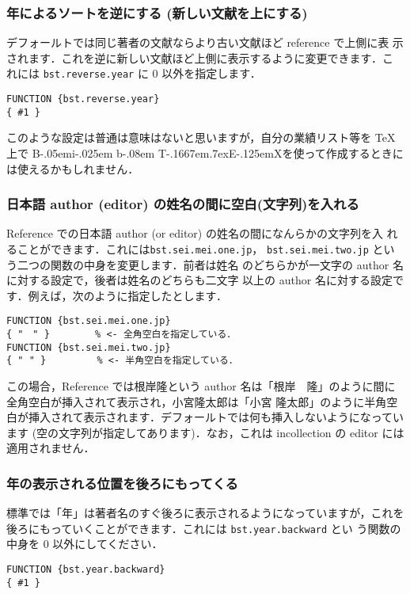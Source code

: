 \documentclass[a4j,10pt]{jarticle}
\def\BibTeX{{\rm B\kern-.05em{\sc i\kern-.025em b}\kern-.08em
    T\kern-.1667em\lower.7ex\hbox{E}\kern-.125emX}}
\begin{document}
\subsubsection{年によるソートを逆にする (新しい文献を上にする)}

デフォールトでは同じ著者の文献ならより古い文献ほど reference で上側に表
示されます．これを逆に新しい文献ほど上側に表示するように変更できます．こ
れには \texttt{bst.reverse.year} に 0 以外を指定します．
\begin{screen}
\begin{verbatim}
FUNCTION {bst.reverse.year}
{ #1 }
\end{verbatim}
\end{screen}

このような設定は普通は意味はないと思いますが，自分の業績リスト等を \TeX 
上で \BibTeX を使って作成するときには使えるかもしれません．

\subsubsection{日本語 author (editor) の姓名の間に空白(文字列)を入れる}

Reference での日本語 author (or editor) の姓名の間になんらかの文字列を入
れることができます．これには\verb|bst.sei.mei.one.jp|，
\verb|bst.sei.mei.two.jp| という二つの関数の中身を変更します．前者は姓名
のどちらかが一文字の author 名に対する設定で，後者は姓名のどちらも二文字
以上の author 名に対する設定です．例えば，次のように指定したとします．
\begin{screen}
\begin{verbatim}
FUNCTION {bst.sei.mei.one.jp}
{ "　" }        % <- 全角空白を指定している．
FUNCTION {bst.sei.mei.two.jp}
{ " " }         % <- 半角空白を指定している．
\end{verbatim}
\end{screen}

この場合，Reference では根岸隆という author 名は「根岸　隆」のように間に
全角空白が挿入されて表示され，小宮隆太郎は「小宮 隆太郎」のように半角空
白が挿入されて表示されます．デフォールトでは何も挿入しないようになってい
ます (空の文字列が指定してあります)．なお，これは incollection の editor 
には適用されません．

\subsubsection{年の表示される位置を後ろにもってくる}

標準では「年」は著者名のすぐ後ろに表示されるようになっていますが，これを
後ろにもっていくことができます．これには \texttt{bst.year.backward} とい
う関数の中身を 0 以外にしてください．
\begin{screen}
\begin{verbatim}
FUNCTION {bst.year.backward}
{ #1 }
\end{verbatim}
\end{screen}
\end{document}
